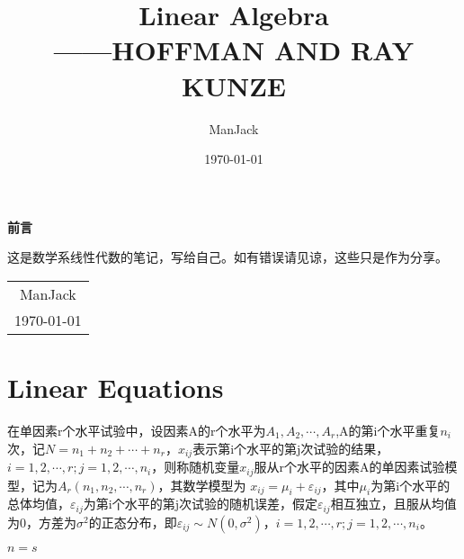 \documentclass[11pt, a4paper, oneside, UTF8]{ctexbook}
\title{{\Huge{\textbf{Linear Algebra}}}\\------HOFFMAN AND RAY KUNZE}
\author{ManJack}
\date{\today}
\newtheorem[M]{theorem}{Theorem}[section]
\newtheorem[M]{lemma}[theorem]{Lemma}
\newtheorem[M]{definition}{Definition}[section]
\begin{document}
\maketitle

\setcounter{page}{1}

\newpage
\begin{center}
  \Huge\textbf{前言}
\end{center}

这是数学系线性代数的笔记，写给自己。如有错误请见谅，这些只是作为分享。

\begin{flushright}
  \begin{tabular}{c}
    ManJack \\
    \today
  \end{tabular}
\end{flushright}

\newpage
\tableofcontents
\newpage
{}
\setcounter{page}{1}

\chapter{Linear Equations}

在单因素r个水平试验中，设因素A的r个水平为$A_1,A_2,\cdots,A_r$,A的第i个水平重复$n_i$次，记$N=n_1+n_2+\cdots+n_r$，$x_{ij}$表示第i个水平的第j次试验的结果，$i=1,2,\cdots,r;j=1,2,\cdots,n_i$，则称随机变量$x_{ij}$服从r个水平的因素A的单因素试验模型，记为$A_{r}(n_1,n_2,\cdots,n_r)$，其数学模型为 $x_{ij}=\mu_i+\varepsilon_{ij}$，其中$\mu_i$为第i个水平的总体均值，$\varepsilon_{ij}$为第i个水平的第j次试验的随机误差，假定$\varepsilon_{ij}$相互独立，且服从均值为0，方差为$\sigma^2$的正态分布，即$\varepsilon_{ij}\sim N(0,\sigma^2)$，$i=1,2,\cdots,r;j=1,2,\cdots,n_i$。

$n = s$
\end{document}
